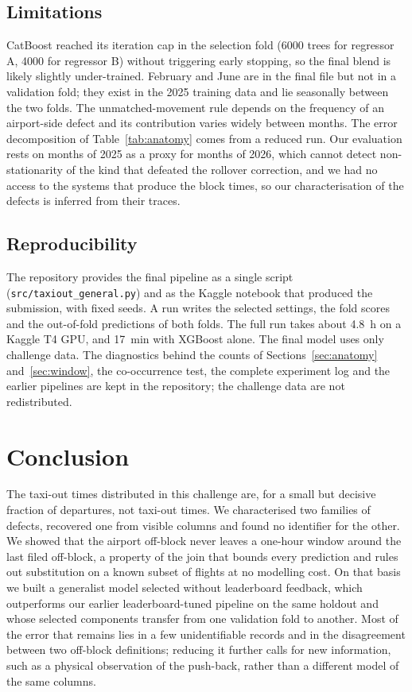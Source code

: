 \documentclass[11pt,a4paper]{article}
\begin{document}
\subsection{Limitations}

CatBoost reached its iteration cap in the selection fold (\num{6000} trees for
regressor A, \num{4000} for regressor B) without triggering early stopping,
so the final blend is likely slightly under-trained. February and June are in
the final file but not in a validation fold; they exist in the 2025 training
data and lie seasonally between the two folds. The unmatched-movement rule
depends on the frequency of an airport-side defect and its contribution varies
widely between months. The error decomposition of Table~\ref{tab:anatomy}
comes from a reduced run. Our evaluation rests on months of 2025 as a proxy for
months of 2026, which cannot detect non-stationarity of the kind that defeated
the rollover correction, and we had no access to the systems that produce the
block times, so our characterisation of the defects is inferred from their
traces.

\subsection{Reproducibility}

The repository provides the final pipeline as a single script
(\texttt{src/taxiout\_general.py}) and as the Kaggle notebook that produced
the submission, with fixed seeds. A run writes the selected settings, the
fold scores and the out-of-fold predictions of both folds. The full run takes
about \SI{4.8}{\hour} on a Kaggle T4 GPU, and \SI{17}{\minute} with XGBoost
alone. The final model uses only challenge data. The diagnostics behind the
counts of Sections~\ref{sec:anatomy} and~\ref{sec:window}, the co-occurrence
test, the complete experiment log and the earlier pipelines are kept in the
repository; the challenge data are not redistributed.

\section{Conclusion}

The taxi-out times distributed in this challenge are, for a small but decisive
fraction of departures, not taxi-out times. We characterised two families of
defects, recovered one from visible columns and found no identifier for the
other. We showed that the airport off-block never leaves a one-hour window
around the last filed off-block, a property of the join that bounds every
prediction and rules out substitution on a known subset of flights at no
modelling cost. On that basis we built a generalist model selected without
leaderboard feedback, which outperforms our earlier leaderboard-tuned pipeline
on the same holdout and whose selected components transfer from one
validation fold to another. Most of the error that remains lies in a few
unidentifiable records and in the disagreement between two off-block
definitions; reducing it further calls for new information, such as a
physical observation of the push-back, rather than a different model of the
same columns.
\end{document}
